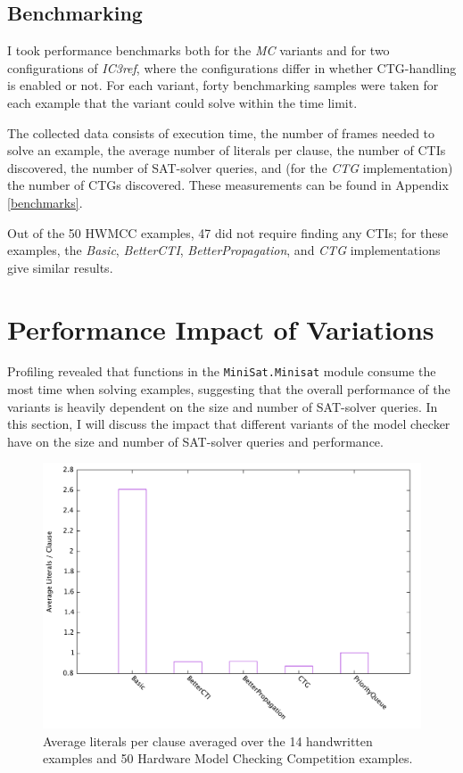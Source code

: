 \documentclass[12pt,a4paper,twoside,openright]{report}
\begin{document}
{{\subsection{Benchmarking}
\label{eval:benchmarking}
I took performance benchmarks both for the \emph{MC} variants and for two configurations
of \emph{IC3ref}, where the configurations differ in whether CTG-handling is enabled
or not. For each variant, forty benchmarking samples were taken for each example that
the variant could solve within the time limit.

The collected data consists of execution time,
the number of frames needed to solve an example,
the average number of literals per clause, the number of CTIs discovered, the number of SAT-solver queries,
and (for the \emph{CTG} implementation) the number of CTGs discovered. These measurements can be found in
Appendix \ref{benchmarks}.

Out of the 50 HWMCC examples, 47 did not require finding any
CTIs; for these examples, the \emph{Basic}, \emph{BetterCTI}, \emph{BetterPropagation},
and \emph{CTG} implementations give similar results. 

\section{Performance Impact of Variations}
\label{eval:variants}

Profiling revealed that functions in the \verb,MiniSat.Minisat, module consume the most time
when solving examples, suggesting that the overall performance of the variants is heavily dependent on
the size and number of SAT-solver queries.
In this section, I will discuss the impact that different
variants of the model checker have on the size and number of SAT-solver queries and performance.

\begin{figure}[t]
\includegraphics[width=16cm]{litspercls.pdf}
\caption{Average literals per clause averaged over the 14 handwritten examples and 50
 Hardware
Model Checking Competition examples.}
\label{eval:lits}
\end{figure}

}}
\end{document}
